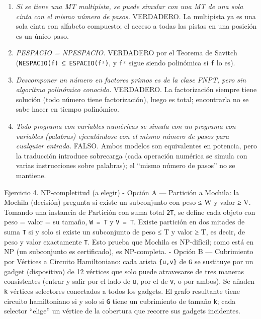 \documentclass[12pt]{book} %
\providecommand{\tightlist}{%
  \setlength{\itemsep}{0pt}\setlength{\parskip}{0pt}}
\begin{document}
\begin{enumerate}
\def\labelenumi{\arabic{enumi}.}
\tightlist
\item
  \emph{Si se tiene una MT multipista, se puede simular con una MT de
  una sola cinta con el mismo número de pasos.} VERDADERO. La multipista
  ya es una sola cinta con alfabeto compuesto; el acceso a todas las
  pistas en una posición es un único paso.
\item
  \emph{PESPACIO = NPESPACIO.} VERDADERO por el Teorema de Savitch
  (\texttt{NESPACIO(f)\ ⊆\ ESPACIO(f²)}, y \texttt{f²} sigue siendo
  polinómica si \texttt{f} lo es).
\item
  \emph{Descomponer un número en factores primos es de la clase FNPT,
  pero sin algoritmo polinómico conocido.} VERDADERO. La factorización
  siempre tiene solución (todo número tiene factorización), luego es
  total; encontrarla no se sabe hacer en tiempo polinómico.
\item
  \emph{Todo programa con variables numéricas se simula con un programa
  con variables (palabras) ejecutándose con el mismo número de pasos
  para cualquier entrada.} FALSO. Ambos modelos son equivalentes en
  potencia, pero la traducción introduce sobrecarga (cada operación
  numérica se simula con varias instrucciones sobre palabras); el
  ``mismo número de pasos'' no se mantiene.
\end{enumerate}

Ejercicio 4. NP-completitud (a elegir) - Opción A --- Partición a
Mochila: la Mochila (decisión) pregunta si existe un subconjunto con
peso ≤ W y valor ≥ V. Tomando una instancia de Partición con suma total
\texttt{2T}, se define cada objeto con peso = valor = su tamaño,
\texttt{W\ =\ T} y \texttt{V\ =\ T}. Existe partición en dos mitades de
suma \texttt{T} si y solo si existe un subconjunto de peso ≤ T y valor ≥
T, es decir, de peso y valor exactamente \texttt{T}. Esto prueba que
Mochila es NP-difícil; como está en NP (un subconjunto es certificado),
es NP-completa. - Opción B --- Cubrimiento por Vértices a Circuito
Hamiltoniano: cada arista \texttt{\{u,v\}} de \texttt{G} se sustituye
por un gadget (dispositivo) de 12 vértices que solo puede atravesarse de
tres maneras consistentes (entrar y salir por el lado de \texttt{u}, por
el de \texttt{v}, o por ambos). Se añaden \texttt{k} vértices selectores
conectados a todos los gadgets. El grafo resultante tiene circuito
hamiltoniano si y solo si \texttt{G} tiene un cubrimiento de tamaño
\texttt{k}; cada selector ``elige'' un vértice de la cobertura que
recorre sus gadgets incidentes.
\end{document}

